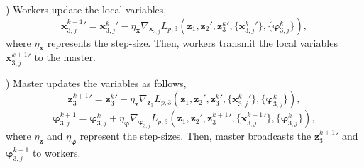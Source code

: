 \documentclass[letterpaper]{article} %
\begin{document}
) Workers update the local variables,
\begin{equation}
{\boldsymbol{x}_{3,j}^{k+1}}' \!=\! {\boldsymbol{x}_{3,j}^{k}}'\!-\!\eta_{\boldsymbol{x}} \!\nabla_{\boldsymbol{x}_{3,j}} L_{p,3}({\boldsymbol{z}_1},{\boldsymbol{z}_2}'\!, {\boldsymbol{z}_3^k}',\! \{{\boldsymbol{x}_{3,j}^k}'\},\! \{\boldsymbol{\varphi}_{3,j}^k\}),
\end{equation}
where $\eta_{\boldsymbol{x}}$ represents the step-size. Then, workers transmit the local variables ${\boldsymbol{x}_{3,j}^{k+1}}'$ to the master.

) Master updates the variables as follows,
\begin{equation}
{\boldsymbol{z}_3^{k+1}}' \!=\! {\boldsymbol{z}_3^k}' \!-\! \eta_{\boldsymbol{z}}\! \nabla_{\boldsymbol{z}_3} L_{p,3}({\boldsymbol{z}_1},{\boldsymbol{z}_2}' \!, {\boldsymbol{z}_3^k}', \! \{{\boldsymbol{x}_{3,j}^k}'\}, \! \{\boldsymbol{\varphi}_{3,j}^k\}),
\end{equation}
\begin{equation}
\boldsymbol{\varphi}_{3,j}^{k+1} \!=\! \boldsymbol{\varphi}_{3,j}^{k}+\eta_{\boldsymbol{\varphi}}\! \nabla_{\boldsymbol{\varphi}_{3,j}} L_{p,3}({\boldsymbol{z}_1},{\boldsymbol{z}_2}' \!, {\boldsymbol{z}_3^{k+1}}', \! \{{\boldsymbol{x}_{3,j}^{k+1}}'\}, \! \{\boldsymbol{\varphi}_{3,j}^k\}),
\end{equation}
where $\eta_{\boldsymbol{z}}$ and $\eta_{\boldsymbol{\varphi}}$ represent the step-sizes. Then, master broadcasts the ${\boldsymbol{z}_3^{k+1}}'$ and $\boldsymbol{\varphi}_{3,j}^{k+1}$ to workers.
\end{document}
